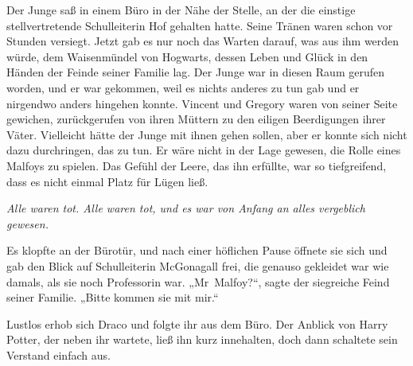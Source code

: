 Der Junge saß in einem Büro in der Nähe der Stelle, an der die einstige stellvertretende Schulleiterin Hof gehalten hatte. Seine Tränen waren schon vor Stunden versiegt. Jetzt gab es nur noch das Warten darauf, was aus ihm werden würde, dem Waisenmündel von Hogwarts, dessen Leben und Glück in den Händen der Feinde seiner Familie lag. Der Junge war in diesen Raum gerufen worden, und er war gekommen, weil es nichts anderes zu tun gab und er nirgendwo anders hingehen konnte. Vincent und Gregory waren von seiner Seite gewichen, zurückgerufen von ihren Müttern zu den eiligen Beerdigungen ihrer Väter. Vielleicht hätte der Junge mit ihnen gehen sollen, aber er konnte sich nicht dazu durchringen, das zu tun. Er wäre nicht in der Lage gewesen, die Rolle eines Malfoys zu spielen. Das Gefühl der Leere, das ihn erfüllte, war so tiefgreifend, dass es nicht einmal Platz für Lügen ließ.

\emph{Alle waren tot. Alle waren tot, und es war von Anfang an alles vergeblich gewesen.}

Es klopfte an der Bürotür, und nach einer höflichen Pause öffnete sie sich und gab den Blick auf Schulleiterin McGonagall frei, die genauso gekleidet war wie damals, als sie noch Professorin war.
„Mr~Malfoy?“, sagte der siegreiche Feind seiner Familie.
„Bitte kommen sie mit mir.“

Lustlos erhob sich Draco und folgte ihr aus dem Büro. Der Anblick von Harry Potter, der neben ihr wartete, ließ ihn kurz innehalten, doch dann schaltete sein Verstand einfach aus.

